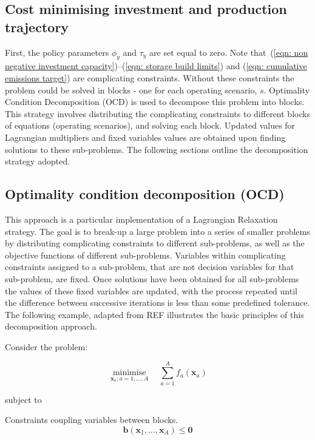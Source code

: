 \documentclass{article}
\newcommand{\iYear}{y}
\newcommand{\iScenario}{s}
\newcommand{\vBaseline}[1][\iYear]{\phi_{#1}}
\newcommand{\vPermitPrice}[1][\iYear]{\tau_{#1}}
\DeclareMathOperator*{\minimise}{minimise}
\begin{document}
\subsection{Cost minimising investment and production trajectory}
First, the policy parameters $\vBaseline$ and $\vPermitPrice$ are set equal to zero. Note that~(\ref{eqn: non negative investment capacity})--(\ref{eqn: storage build limits}) and (\ref{eqn: cumulative emissions target}) are complicating constraints. Without these constraints the problem could be solved in blocks - one for each operating scenario, $\iScenario$. Optimality Condition Decomposition (OCD) is used to decompose this problem into blocks. This strategy involves distributing the complicating constraints to different blocks of equations (operating scenarios), and solving each block. Updated values for Lagrangian multipliers and fixed variables values are obtained upon finding solutions to these sub-problems. The following sections outline the decomposition strategy adopted.

\subsection{Optimality condition decomposition (OCD)}
This approach is a particular implementation of a Lagrangian Relaxation strategy. The goal is to break-up a large problem into a series of smaller problems by distributing complicating constraints to different sub-problems, as well as the objective functions of different sub-problems. Variables within complicating constraints assigned to a sub-problem, that are not decision variables for that sub-problem, are fixed. Once solutions have been obtained for all sub-problems the values of these fixed variables are updated, with the process repeated until the difference between successive iterations is less than some predefined tolerance. The following example, adapted from REF illustrates the basic principles of this decomposition approach.

Consider the problem:

\begin{equation}
	\minimise\limits_{\bm{x}_{a}; a=1,\ldots, A} \quad \sum\limits_{a=1}^{A}f_{a}(\bm{x}_{a})
\end{equation}

subject to

Constraints coupling variables between blocks.
\begin{equation}
	\bm{b}\left(\bm{x}_{1}, \ldots, \bm{x}_{A}\right) \leq \bm{0}
	\label{eqn: complicating inequality constraint}
\end{equation}
\end{document}
